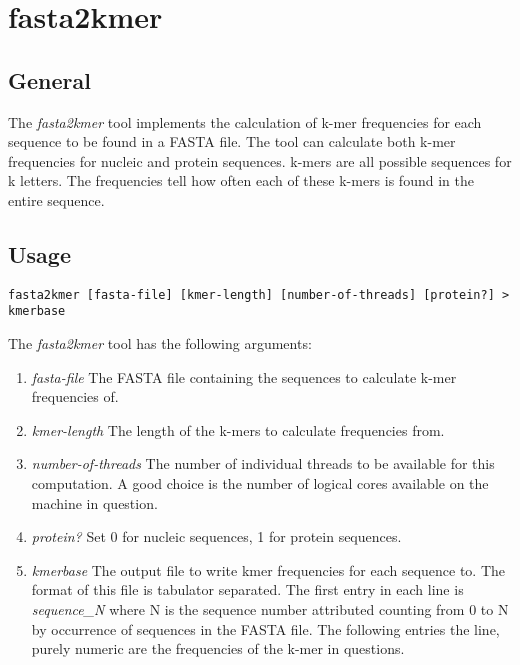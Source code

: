 \section{fasta2kmer} \label{sec-fasta2kmer}

\subsection{General}

The \emph{fasta2kmer} tool implements the calculation of k-mer
frequencies for each sequence to be found in a FASTA \cite{fasta}
file. The tool can calculate both k-mer frequencies for nucleic and
protein sequences. k-mers are all possible sequences for k
letters. The frequencies tell how often each of these k-mers is found
in the entire sequence.

\subsection{Usage}

\begin{lstlisting}
fasta2kmer [fasta-file] [kmer-length] [number-of-threads] [protein?] > kmerbase
\end{lstlisting}
The \emph{fasta2kmer} tool has the following arguments:
\begin{enumerate}
  \item \emph{fasta-file} The FASTA file containing the sequences to
    calculate k-mer frequencies of.
  \item \emph{kmer-length} The length of the k-mers to calculate
    frequencies from.
  \item \emph{number-of-threads} The number of individual threads to
    be available for this computation. A good choice is the number of
    logical cores available on the machine in question.
  \item \emph{protein?} Set 0 for nucleic sequences, 1 for protein
    sequences.
  \item \emph{kmerbase} The output file to write kmer frequencies
    for each sequence to. The format of this file is tabulator
    separated. The first entry in each line is 
    \emph{sequence\_N} where N is the sequence number attributed
    counting from 0 to N by occurrence of sequences in the FASTA
    file. The following entries the line, purely numeric are the
    frequencies of the k-mer in questions.
\end{enumerate}

